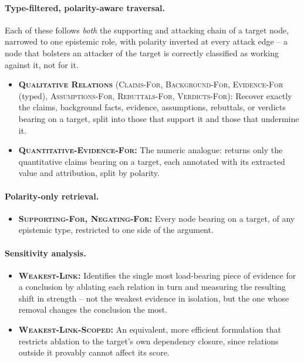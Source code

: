 \documentclass{article}
\begin{document}
\paragraph{Type-filtered, polarity-aware traversal.}
Each of these follows \emph{both} the supporting and attacking chain of a
target node, narrowed to one epistemic role, with polarity inverted at every
attack edge -- a node that bolsters an attacker of the target is correctly
classified as working against it, not for it.
\begin{itemize}
    \item \textbf{\textsc{Qualitative Relations}} 
        (\textsc{Claims-For}, \textsc{Background-For}, \textsc{Evidence-For} (typed), \textsc{Assumptions-For}, \textsc{Rebuttals-For}, \textsc{Verdicts-For}): 
        Recover exactly the claims, background facts, evidence, assumptions, rebuttals, or verdicts bearing on a target, split into those that support it and those that undermine it.
        
    \item \textbf{\textsc{Quantitative-Evidence-For}:} 
        The numeric analogue: returns only the quantitative claims bearing on a target, each annotated with its extracted value and attribution, split by polarity.
\end{itemize}

\paragraph{Polarity-only retrieval.}
\begin{itemize}
    \item \textbf{\textsc{Supporting-For}, \textsc{Negating-For}:} Every node bearing
        on a target, of any epistemic type, restricted to one side of the
        argument.
\end{itemize}

\paragraph{Sensitivity analysis.}
\begin{itemize}
    \item \textbf{\textsc{Weakest-Link}:} Identifies the single most load-bearing
        piece of evidence for a conclusion by ablating each relation in turn
        and measuring the resulting shift in strength -- not the weakest
        evidence in isolation, but the one whose removal changes the
        conclusion the most.
    \item \textbf{\textsc{Weakest-Link-Scoped}:} An equivalent, more efficient
        formulation that restricts ablation to the target's own dependency
        closure, since relations outside it provably cannot affect its
        score.
\end{itemize}
\end{document}

